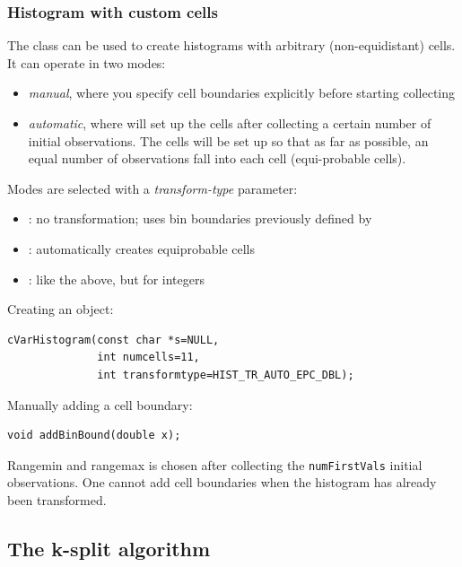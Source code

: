 \subsubsection{Histogram with custom cells}


The  class can be used to create
histograms with arbitrary (non-equidistant) cells.
It can operate in two modes:

\begin{itemize}
  \item \textit{manual}, where you specify cell boundaries explicitly
     before starting collecting
  \item \textit{automatic}, where  will set up the cells
     after collecting a certain number of initial observations. The cells
     will be set up so that as far as possible, an equal number of observations
     fall into each cell (equi-probable cells).
\end{itemize}

Modes are selected with a \textit{transform-type} parameter:
\begin{itemize}
  \item{: no transformation; uses bin boundaries
    previously defined by }
  \item{: automatically creates equiprobable cells}
  \item{: like the above, but for integers}
\end{itemize}

Creating an object:

\begin{verbatim}
cVarHistogram(const char *s=NULL,
              int numcells=11,
              int transformtype=HIST_TR_AUTO_EPC_DBL);
\end{verbatim}

Manually adding a cell boundary:

\begin{verbatim}
void addBinBound(double x);
\end{verbatim}

Rangemin and rangemax is chosen after collecting the
\texttt{numFirstVals} initial observations. One cannot add cell
boundaries when the histogram has already been transformed.





\subsection{The k-split algorithm}


